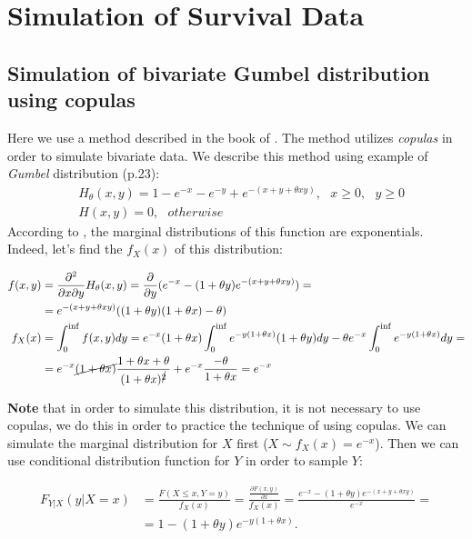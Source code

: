\documentclass[]{article}
\begin{document}
\section{Simulation of Survival Data}

\subsection{Simulation of bivariate Gumbel distribution using copulas}

Here we use a method described in the book of \cite{nelsen2007introduction}. The method utilizes \emph{copulas} in order to simulate bivariate data. We describe this method using example of \emph{Gumbel} distribution (p.23):
	$$
	\begin{aligned}
    &H_{\theta}(x, y) = 1-e^{-x} - e^{-y} + e^{-(x+y+\theta xy)}, ~~~ x\geq 0, ~~~y\geq 0\\
    &H(x,y) = 0, ~~~otherwise
	\end{aligned}
	$$
According to \cite{nelsen2007introduction}, the marginal distributions of this function are exponentials. Indeed, let's find the $f_X(x)$ of this distribution:

$$
\begin{aligned}
    f(x,y) & = \frac{\partial^2}{\partial x \partial y}H_{\theta}(x, y) = \frac{\partial}{\partial y}(e^{-x} - (1+\theta y)e^{-(x+y+\theta xy)}) =\\
      & = e^{-(x+y+\theta xy)}((1+\theta y)(1+\theta x) - \theta)\\
    f_X(x) & = \int_0^{\inf} f(x,y)dy = e^{-x}(1 + \theta x)\int_0^{\inf}e^{-y(1+\theta x)} (1 + \theta y) dy  - \theta e^{-x} \int_0^{\inf} e^{-y(1+\theta x)} dy = \\
    & = e^{-x}\cancel{(1 + \theta x)} \frac{1+\theta x + \theta}{(1+\theta x)^{\cancel{2}}} + e^{-x}\frac{-\theta}{1 + \theta x} = e^{-x}
\end{aligned}
$$

\textbf{Note} that in order to simulate this distribution, it is not necessary to use copulas, we do this in order to practice the technique of using copulas. We can simulate the marginal distribution for $X$ first ($X \sim f_X(x) = e^{-x}$). Then we can use conditional distribution function for $Y$ in order to sample $Y$: 


$$
\begin{aligned}
F_{Y|X}(y|X=x) &= \frac{F(X\leq x,Y=y)}{f_X(x)}= \frac{\frac{\partial F(x,y)}{\partial x}}{f_X(x)} =\frac{ e^{-x} - (1+\theta y)e^{-(x+y+\theta xy)}}{e^{-x}} =\\
&= 1 - (1+\theta y)e^{-y(1+\theta x)}.
\end{aligned}
$$
\end{document}
